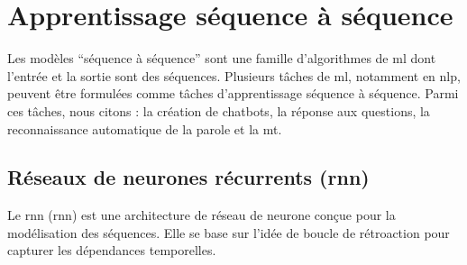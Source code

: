 \chapter{Apprentissage séquence à séquence}

Les modèles ``séquence à séquence'' sont une famille d'algorithmes de \acrfull{ml}
dont l'entrée et la sortie sont des séquences.
Plusieurs tâches de \acrlong{ml}, notamment en \acrfull{nlp}, 
peuvent être formulées comme tâches d'apprentissage séquence à séquence.
Parmi ces tâches, nous citons : la création de chatbots, la réponse aux questions, 
la reconnaissance automatique de la parole et la \acrlong{mt}.


\section{Réseaux de neurones récurrents (\acrshort{rnn})}

Le \acrshort{rnn} (\Acrlong{rnn}) est une architecture de réseau de neurone 
conçue pour la modélisation des séquences.
Elle se base sur l'idée de boucle de rétroaction pour capturer les dépendances temporelles.

